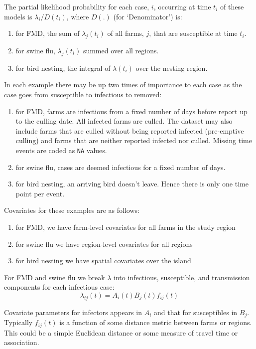 \documentclass{article}
\begin{document}
The partial likelihood probability for each case, $i$, occurring at time $t_i$ of
these models is $\lambda_i/D(t_i)$, where $D(.)$ (for `Denominator') is:

\begin{enumerate}
\item for FMD, the sum of $\lambda_j(t_i)$ of all farms, $j$, that are susceptible at time $t_i$.
\item for swine flu, $\lambda_j(t_i)$ summed over all regions.
\item for bird nesting, the integral of $\lambda(t_i)$ over the nesting region.
\end{enumerate}

In each example there may be up two times of importance to each case as the case goes from susceptible
to infectious to removed:

\begin{enumerate}
\item for FMD, farms are infectious from a fixed number of days
  before report up to the culling date. All infected farms are
  culled. The dataset may also include farms that are culled without
  being reported infected (pre-emptive culling) and farms that are
  neither reported infected nor culled. Missing time events are coded as {\tt NA} values.
\item for swine flu, cases are deemed infectious for a fixed number of days.
\item for bird nesting, an arriving bird doesn't leave. Hence there is only one time point per event.
\end{enumerate}

Covariates for these examples are as follows:

\begin{enumerate}
\item for FMD, we have farm-level covariates for all farms in the study region
\item for swine flu we have region-level covariates for all regions
\item for bird nesting we have spatial covariates over the island
\end{enumerate}

For FMD and swine flu we break $\lambda$ into infectious, susceptible, and transmission components for
each infectious case:
$$
\lambda_{ij}(t) = A_i(t)B_j(t)f_{ij}(t)
$$

Covariate parameters for infectors appears in $A_i$ and that for susceptibles in $B_j$.
Typically $f_{ij}(t)$ is a function of some distance metric between farms or regions. This could be 
a simple Euclidean distance or some measure of travel time or association.
\end{document}
